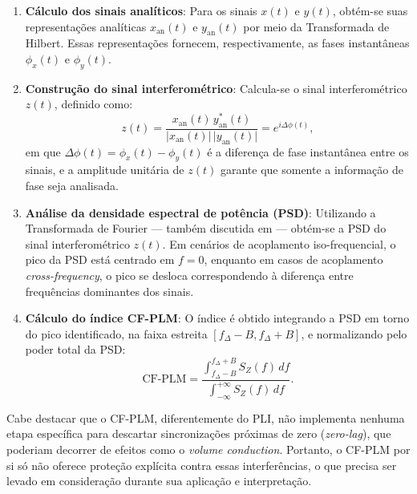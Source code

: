 \begin{enumerate}
    \item \textbf{Cálculo dos sinais analíticos}: Para os sinais \(x(t)\) e \(y(t)\), obtém-se suas representações analíticas \(x_{\mathrm{an}}(t)\) e \(y_{\mathrm{an}}(t)\) por meio da Transformada de Hilbert. Essas representações fornecem, respectivamente, as fases instantâneas \(\phi_x(t)\) e \(\phi_y(t)\).

    \item \textbf{Construção do sinal interferométrico}: Calcula-se o sinal interferométrico \(z(t)\), definido como:
    \[
    z(t) = \frac{x_{\mathrm{an}}(t)\, y_{\mathrm{an}}^*(t)}{\lvert x_{\mathrm{an}}(t)\rvert\, \lvert y_{\mathrm{an}}(t)\rvert} = e^{i\Delta \phi(t)},
    \]
    em que \(\Delta \phi(t) = \phi_x(t) - \phi_y(t)\) é a diferença de fase instantânea entre os sinais, e a amplitude unitária de \(z(t)\) garante que somente a informação de fase seja analisada.

    \item \textbf{Análise da densidade espectral de potência (PSD)}: Utilizando a Transformada de Fourier — também discutida em  — obtém-se a PSD do sinal interferométrico \(z(t)\). Em cenários de acoplamento iso-frequencial, o pico da PSD está centrado em \(f = 0\), enquanto em casos de acoplamento \textit{cross-frequency}, o pico se desloca correspondendo à diferença entre frequências dominantes dos sinais.

    \item \textbf{Cálculo do índice CF-PLM}: O índice é obtido integrando a PSD em torno do pico identificado, na faixa estreita \([f_\Delta - B, f_\Delta + B]\), e normalizando pelo poder total da PSD:
    \[
    \text{CF-PLM} = \frac{\displaystyle\int_{f_\Delta - B}^{f_\Delta + B} S_Z(f) \, df}{\displaystyle\int_{-\infty}^{+\infty} S_Z(f) \, df}.
    \]
\end{enumerate}

Cabe destacar que o CF-PLM, diferentemente do PLI, não implementa nenhuma etapa específica para descartar sincronizações próximas de zero (\textit{zero-lag}), que poderiam decorrer de efeitos como o \textit{volume conduction}. Portanto, o CF-PLM por si só não oferece proteção explícita contra essas interferências, o que precisa ser levado em consideração durante sua aplicação e interpretação.


